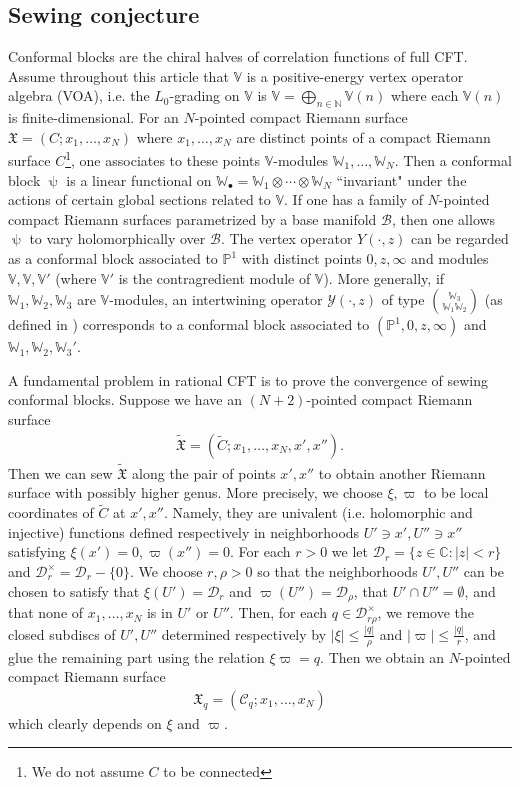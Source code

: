 \documentclass[11pt,b5paper,notitlepage]{article}
\theoremstyle{definition}
\theoremstyle{plain}
\newcommand{\fk}{\mathfrak}
\newcommand{\mc}{\mathcal}
\newcommand{\wtd}{\widetilde}
\newcommand{\blt}{\bullet}
\newcommand{\Vbb}{\mathbb V}
\newcommand{\Wbb}{\mathbb W}
\newcommand{\Cbb}{\mathbb C}
\newcommand{\Nbb}{\mathbb N}
\newcommand{\Pbb}{\mathbb P}
\numberwithin{equation}{section}
\begin{document}
\subsection*{Sewing conjecture}



Conformal blocks are the chiral halves of correlation functions of full CFT. Assume throughout this article that $\Vbb$ is a positive-energy vertex operator algebra (VOA), i.e. the $L_0$-grading on $\Vbb$ is $\Vbb=\bigoplus_{n\in\Nbb}\Vbb(n)$ where each $\Vbb(n)$ is finite-dimensional. For an $N$-pointed  compact Riemann surface $\fk X=(C;x_1,\dots,x_N)$ where  $x_1,\dots,x_N$ are distinct points of a compact Riemann surface $C$\footnote{We do not assume $C$ to be connected},  one associates to these points $\Vbb$-modules $\Wbb_1,\dots,\Wbb_N$. Then a conformal block $\uppsi$ is a  linear functional on $\Wbb_\blt=\Wbb_1\otimes\cdots\otimes\Wbb_N$ ``invariant" under the actions of certain global sections  related to $\Vbb$. If one has a family of $N$-pointed compact Riemann surfaces parametrized by a base manifold $\mc B$, then one allows $\uppsi$ to vary holomorphically over $\mc B$. The vertex operator $Y(\cdot,z)$ can be regarded as a conformal block associated to $\Pbb^1$ with distinct points $0,z,\infty$ and modules $\Vbb,\Vbb,\Vbb'$ (where $\Vbb'$ is the contragredient module of $\Vbb$). More generally, if $\Wbb_1,\Wbb_2,\Wbb_3$ are $\Vbb$-modules, an intertwining operator $\mc Y(\cdot,z)$ of type $\Wbb_3\choose\Wbb_1\Wbb_2$ (as defined in \cite{FHL93}) corresponds to a conformal block associated to $(\Pbb^1,0,z,\infty)$ and $\Wbb_1,\Wbb_2,\Wbb_3'$.

A fundamental problem in rational CFT is to prove the convergence of sewing conformal blocks.  Suppose  we have an $(N+2)$-pointed compact Riemann surface
\begin{align*}
\wtd{\fk X}=(\wtd C;x_1,\dots,x_N,x',x'').
\end{align*}
Then we can sew $\wtd{\fk X}$ along the pair of points $x',x''$ to obtain another Riemann surface with possibly higher genus. More precisely, we choose $\xi,\varpi$ to be local coordinates of $\wtd C$ at $x',x''$. Namely, they are univalent  (i.e. holomorphic and injective) functions defined respectively in neighborhoods $U'\ni x',U''\ni x''$ satisfying $\xi(x')=0,\varpi(x'')=0$. For each $r>0$ we let $\mc D_r=\{z\in\Cbb:|z|<r\}$ and $\mc D_r^\times=\mc D_r-\{0\}$. We choose $r,\rho>0$ so that the neighborhoods $U',U''$ can be chosen to satisfy that $\xi(U')=\mc D_r$ and $\varpi(U'')=\mc D_\rho$, that  $U'\cap U''=\emptyset$, and that none of $x_1,\dots,x_N$ is in $U'$ or $U''$. Then, for each $q\in\mc D_{r\rho}^\times$, we remove the closed subdiscs of $U',U''$ determined respectively by $|\xi|\leq \frac {|q|}\rho$ and $|\varpi|\leq \frac{|q|}r$, and glue the remaining part using the relation $\xi\varpi=q$. Then we obtain an $N$-pointed compact Riemann surface
\begin{align*}
\fk X_q=(\mc C_q;x_1,\dots,x_N)
\end{align*}
which clearly depends on $\xi$ and $\varpi$.
\end{document}
